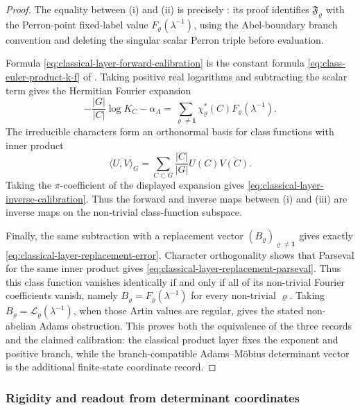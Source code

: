 \documentclass[11pt,a4paper]{amsart}
\theoremstyle{plain}
\theoremstyle{definition}
\theoremstyle{remark}
\begin{document}
\begin{proof}
  The equality between \textup{(i)} and \textup{(ii)} is precisely
  : its proof identifies
  \(\mathfrak F_\varrho\) with the Perron-point fixed-label value
  \(F_\varrho(\lambda^{-1})\), using the Abel-boundary branch convention and
  deleting the singular scalar Perron triple before evaluation.

  Formula \eqref{eq:classical-layer-forward-calibration} is the constant
  formula \eqref{eq:class-euler-product-k-f} of
  .  Taking positive real logarithms and
  subtracting the scalar term gives the Hermitian Fourier expansion
  \[
    -\frac{|G|}{|C|}\log K_C-\alpha_A
    =
    \sum_{\varrho\neq\mathbf1}
      \chi_\varrho^\ast(C)F_\varrho(\lambda^{-1}).
  \]
  The irreducible characters form an orthonormal basis for class functions with
  inner product
  \[
    \langle U,V\rangle_G
    =\sum_{C\subset G}\frac{|C|}{|G|}U(C)\overline{V(C)}.
  \]
  Taking the \(\pi\)-coefficient of the displayed expansion gives
  \eqref{eq:classical-layer-inverse-calibration}.  Thus the forward and inverse
  maps between \textup{(i)} and \textup{(iii)} are inverse maps on the
  non-trivial class-function subspace.

  Finally, the same subtraction with a replacement vector
  \((B_\varrho)_{\varrho\neq\mathbf1}\) gives exactly
  \eqref{eq:classical-layer-replacement-error}.  Character orthogonality shows
  that Parseval for the same inner product gives
  \eqref{eq:classical-layer-replacement-parseval}.  Thus this class function
  vanishes identically if and only if all of its non-trivial Fourier
  coefficients vanish, namely
  \(B_\varrho=F_\varrho(\lambda^{-1})\) for every non-trivial
  \(\varrho\).  Taking
  \(B_\varrho=\mathcal L_\varrho(\lambda^{-1})\), when those Artin values are
  regular, gives the stated non-abelian Adams obstruction.  This proves both
  the equivalence of the three records and the claimed calibration: the
  classical product layer fixes the exponent and positive branch, while the
  branch-compatible Adams--M\"obius determinant vector is the additional
  finite-state coordinate record.
\end{proof}

\subsubsection{Rigidity and readout from determinant coordinates}
\end{document}
